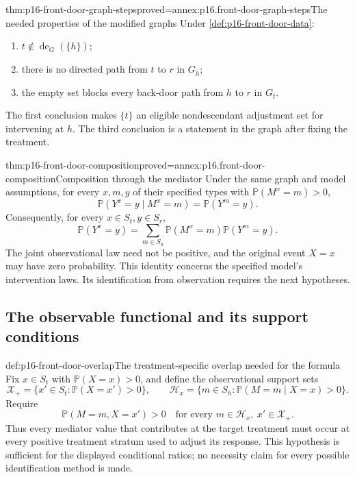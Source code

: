 \begin{hblemma}{thm:p16-front-door-graph-steps}{proved=annex:p16.front-door-graph-steps}{The needed properties of the modified graphs}
Under \cref{def:p16-front-door-data}:
\begin{enumerate}
\item \(t\notin\operatorname{de}_G(\{h\})\);
\item there is no directed path from \(t\) to \(r\) in
      \(G_{\overline h}\);
\item the empty set blocks every back-door path from \(h\) to
      \(r\) in \(G_{\overline t}\).
\end{enumerate}
The first conclusion makes \(\{t\}\) an eligible nondescendant
adjustment set for intervening at \(h\). The third conclusion is
a statement in the graph after fixing the treatment.
\end{hblemma}

\begin{hbtheorem}{thm:p16-front-door-composition}{proved=annex:p16.front-door-composition}{Composition through the mediator}
Under the same graph and model assumptions, for every \(x,m,y\)
of their specified types with \(\mathbb P(M^x=m)>0\),
\[
 \mathbb P(Y^x=y\mid M^x=m)=\mathbb P(Y^m=y).
\]
Consequently, for every \(x\in S_t,y\in S_r\),
\[
 \mathbb P(Y^x=y)
    =\sum_{m\in S_h}\mathbb P(M^x=m)\mathbb P(Y^m=y).
\]
The joint observational law need not be positive, and the original
event \(X=x\) may have zero probability. This identity concerns
the specified model's intervention laws. Its identification from
observation requires the next hypotheses.
\end{hbtheorem}

\subsection{The observable functional and its support conditions}

\begin{hbdefinition}{def:p16-front-door-overlap}{The treatment-specific overlap needed for the formula}
Fix \(x\in S_t\) with \(\mathbb P(X=x)>0\), and define the
observational support sets
\[
 \mathcal X_+=\{x'\in S_t:\mathbb P(X=x')>0\},\qquad
 \mathcal H_x=\{m\in S_h:\mathbb P(M=m\mid X=x)>0\}.
\]
Require
\[
 \mathbb P(M=m,X=x')>0
       \quad\text{for every }m\in\mathcal H_x,
                             \ x'\in\mathcal X_+.
\]
Thus every mediator value that contributes at the target treatment must
occur at every positive treatment stratum used to adjust its response.
This hypothesis is sufficient for the displayed conditional ratios;
no necessity claim for every possible identification method is made.
\end{hbdefinition}

